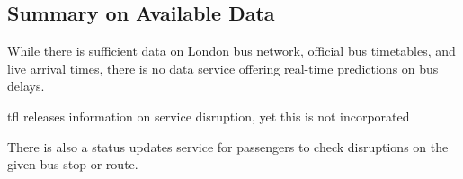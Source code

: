 \subsection{Summary on Available Data}
\par While there is sufficient data on London bus network, official bus timetables, and live arrival times, there is no data service offering real-time predictions on bus delays.

\par \acrshort{tfl} releases information on service disruption, yet this is not incorporated


There is also a status updates service for passengers to check disruptions on the given bus stop or route.

